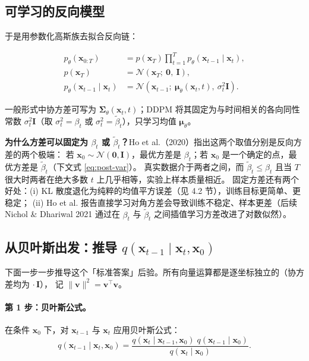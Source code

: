 \documentclass[a4paper,fontset=none,zihao=5]{ctexart}
\numberwithin{equation}{section}
\newcommand{\x}{\mathbf{x}}
\newcommand{\I}{\mathbf{I}}
\newcommand{\N}{\mathcal{N}}
\newcommand{\mutheta}{\boldsymbol{\mu}_\theta}
\newcommand{\btil}{\tilde{\beta}}
\begin{document}
\subsection{可学习的反向模型}
于是用参数化高斯族去拟合反向链：
\begin{keybox}
\begin{align}
  p_\theta(\x_{0:T}) &= p(\x_T)\prod_{t=1}^{T} p_\theta(\x_{t-1}\mid\x_t), \label{eq:rev-joint}\\
  p(\x_T) &= \N(\x_T;\ \mathbf{0},\ \I), \\
  p_\theta(\x_{t-1}\mid\x_t) &= \N\!\left(\x_{t-1};\ \mutheta(\x_t,t),\ \sigma_t^2\I\right). \label{eq:rev-step}
\end{align}
\end{keybox}
一般形式中协方差可写为 $\boldsymbol{\Sigma}_\theta(\x_t,t)$；DDPM 将其固定为与时间相关的各向同性常数 $\sigma_t^2\I$（取 $\sigma_t^2=\beta_t$ 或 $\sigma_t^2=\btil_t$），只学习均值 $\mutheta$。

\begin{whybox}
\textbf{为什么方差可以固定为 $\beta_t$ 或 $\btil_t$？}Ho et al.（2020）指出这两个取值分别是反向方差的两个极端：
若 $\x_0\sim\N(\mathbf{0},\I)$，最优方差是 $\beta_t$；若 $\x_0$ 是一个确定的点，最优方差是 $\btil_t$（下文式 \eqref{eq:post-var}）。
真实数据介于两者之间，而 $\btil_t\le\beta_t$ 且当 $T$ 很大时两者在绝大多数 $t$ 上几乎相等，实验上样本质量相近。
固定方差还有两个好处：(i) KL 散度退化为纯粹的均值平方误差（见 4.2 节），训练目标更简单、更稳定；
(ii) Ho et al. 报告直接学习对角方差会导致训练不稳定、样本更差（后续 Nichol \& Dhariwal 2021 通过在 $\beta_t$ 与 $\btil_t$ 之间插值学习方差改进了对数似然）。
\end{whybox}

\subsection{从贝叶斯出发：推导 \texorpdfstring{$q(\x_{t-1}\mid\x_t,\x_0)$}{q(x\_{t-1}|x\_t,x\_0)}}
下面一步一步推导这个「标准答案」后验。所有向量运算都是逐坐标独立的（协方差均为 $\cdot\,\I$），
记 $\|\mathbf{v}\|^2=\mathbf{v}^\top\mathbf{v}$。

\paragraph{第 1 步：贝叶斯公式。}在条件 $\x_0$ 下，对 $\x_{t-1}$ 与 $\x_t$ 应用贝叶斯公式：
\begin{equation}
  q(\x_{t-1}\mid\x_t,\x_0)=\frac{q(\x_t\mid\x_{t-1},\x_0)\;q(\x_{t-1}\mid\x_0)}{q(\x_t\mid\x_0)} .
  \label{eq:bayes}
\end{equation}
\end{document}
